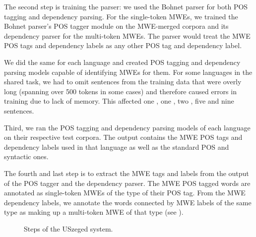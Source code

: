 \documentclass[output=paper,
modfonts,
]{langscibook}
\begin{document}
The second step is training the parser: we used the Bohnet parser \citep{bohnet:2010:PAPERS} for both POS tagging and dependency parsing. For the single-token MWEs, we trained the Bohnet parser's POS tagger module on the MWE-merged corpora and its dependency parser for the multi-token MWEs. The parser would treat the MWE POS tags and dependency labels as any other POS tag and dependency label. 

We did the same for each language and created POS tagging and dependency parsing models capable of identifying MWEs for them. For some languages in the shared task, we had to omit sentences from the training data that were overly long (spanning over 500 tokens in some cases) and therefore caused errors in training due to lack of memory. This affected one , one , two , five  and nine  sentences.

Third, we ran the POS tagging and dependency parsing models of each language on their respective test corpora. The output contains the MWE POS tags and dependency labels used in that language as well as the standard POS and syntactic ones.

The fourth and last step is to extract the MWE tags and labels from the output of the POS tagger and the dependency parser. The MWE POS tagged words are annotated as single-token MWEs of the type of their POS tag. From the MWE dependency labels, we annotate the words connected by MWE labels of the same type as making up a multi-token MWE of that type (see ).

\begin{figure}
\vspace{2em}
\hspace{1em}
\caption{Steps of the USzeged system.}
\label{szeged}
\end{figure}
\end{document}
